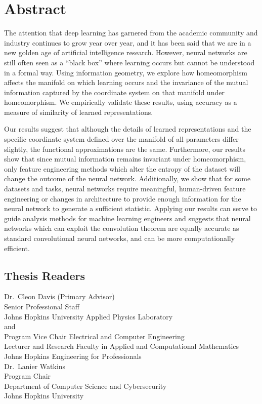 \chapter*{Abstract}
%
The attention that deep learning has garnered from the academic community and industry continues to grow year over year, and it has been said that we are in a new golden age of artificial intelligence research.
However, neural networks are still often seen as a ``black box'' where learning occurs but cannot be understood in a formal way.
Using information geometry, we explore how homeomorphism affects the manifold on which learning occurs and the invariance of the mutual information captured by the coordinate system on that manifold under homeomorphism.
We empirically validate these results, using accuracy as a measure of similarity of learned representations.

Our results suggest that although the details of learned representations and the specific coordinate system defined over the manifold of all parameters differ slightly, the functional approximations are the same.
Furthermore, our results show that since mutual information remains invariant under homeomorphism, only feature engineering methods which alter the entropy of the dataset will change the outcome of the neural network.
Additionally, we show that for some datasets and tasks, neural networks require meaningful, human-driven feature engineering or changes in architecture to provide enough information for the neural network to generate a sufficient statistic.
Applying our results can serve to guide analysis methods for machine learning engineers and suggests that neural networks which can exploit the convolution theorem are equally accurate as standard convolutional neural networks, and can be more computationally efficient.
%
\section*{Thesis Readers}
\begin{singlespace}
%
\noindent Dr.~Cleon Davis (Primary Advisor)\\
\indent \indent Senior Professional Staff\\
\indent \indent Johns Hopkins University Applied Physics Laboratory\\

\indent \indent and\\

\indent \indent Program Vice Chair Electrical and Computer Engineering\\
\indent \indent Lecturer and Research Faculty in Applied and Computational Mathematics\\
\indent \indent Johns Hopkins Engineering for Professionals\\


\noindent Dr.~Lanier Watkins\\
\indent \indent Program Chair\\
\indent \indent Department of Computer Science and Cybersecurity\\
\indent \indent Johns Hopkins University\\
\end{singlespace}